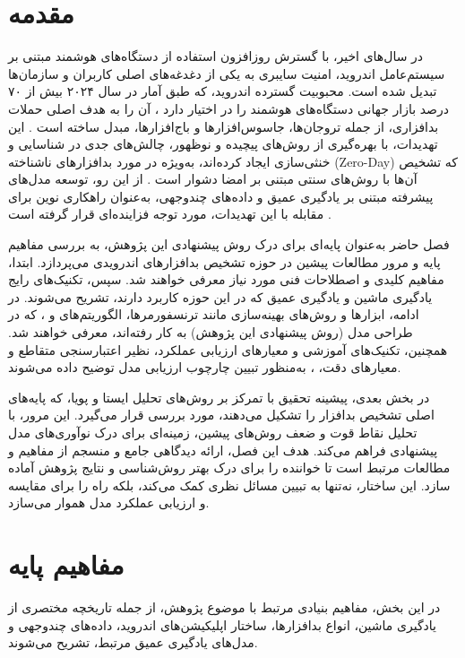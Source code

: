 \section{مقدمه}
در سال‌های اخیر، با گسترش روزافزون استفاده از دستگاه‌های هوشمند مبتنی بر سیستم‌عامل اندروید، امنیت سایبری به یکی از دغدغه‌های اصلی کاربران و سازمان‌ها تبدیل شده است. محبوبیت گسترده اندروید، که طبق آمار  در سال ۲۰۲۴ بیش از ۷۰ درصد بازار جهانی دستگاه‌های هوشمند را در اختیار دارد ، آن را به هدف اصلی حملات بدافزاری، از جمله تروجان‌ها، جاسوس‌افزارها و باج‌افزارها، مبدل ساخته است \cite{AndroidSecurity}. این تهدیدات، با بهره‌گیری از روش‌های پیچیده و نوظهور، چالش‌های جدی در شناسایی و خنثی‌سازی ایجاد کرده‌اند، به‌ویژه در مورد بدافزارهای ناشناخته (Zero-Day) که تشخیص آن‌ها با روش‌های سنتی مبتنی بر امضا دشوار است \cite{AndroidMalwareSurvey}. از این رو، توسعه مدل‌های پیشرفته مبتنی بر یادگیری عمیق و داده‌های چندوجهی، به‌عنوان راهکاری نوین برای مقابله با این تهدیدات، مورد توجه فزاینده‌ای قرار گرفته است \cite{DeepLearningMalware}.

فصل حاضر به‌عنوان پایه‌ای برای درک روش پیشنهادی این پژوهش، به بررسی مفاهیم پایه و مرور مطالعات پیشین در حوزه تشخیص بدافزارهای اندرویدی می‌پردازد. ابتدا، مفاهیم کلیدی و اصطلاحات فنی مورد نیاز معرفی خواهند شد. سپس، تکنیک‌های رایج یادگیری ماشین و یادگیری عمیق که در این حوزه کاربرد دارند، تشریح می‌شوند. در ادامه، ابزارها و روش‌های بهینه‌سازی مانند ترنسفورمرها، الگوریتم‌های  و ، که در طراحی مدل  (روش پیشنهادی این پژوهش) به کار رفته‌اند، معرفی خواهند شد. همچنین، تکنیک‌های آموزشی و معیارهای ارزیابی عملکرد، نظیر اعتبارسنجی متقاطع و معیارهای دقت، ، به‌منظور تبیین چارچوب ارزیابی مدل توضیح داده می‌شوند.

در بخش بعدی، پیشینه تحقیق با تمرکز بر روش‌های تحلیل ایستا و پویا، که پایه‌های اصلی تشخیص بدافزار را تشکیل می‌دهند، مورد بررسی قرار می‌گیرد. این مرور، با تحلیل نقاط قوت و ضعف روش‌های پیشین، زمینه‌ای برای درک نوآوری‌های مدل پیشنهادی فراهم می‌کند. هدف این فصل، ارائه دیدگاهی جامع و منسجم از مفاهیم و مطالعات مرتبط است تا خواننده را برای درک بهتر روش‌شناسی و نتایج پژوهش آماده سازد. این ساختار، نه‌تنها به تبیین مسائل نظری کمک می‌کند، بلکه راه را برای مقایسه و ارزیابی عملکرد مدل  هموار می‌سازد.

\section{مفاهیم پایه}
در این بخش، مفاهیم بنیادی مرتبط با موضوع پژوهش، از جمله تاریخچه مختصری از یادگیری ماشین، انواع بدافزارها، ساختار اپلیکیشن‌های اندروید، داده‌های چندوجهی و مدل‌های یادگیری عمیق مرتبط، تشریح می‌شوند.

